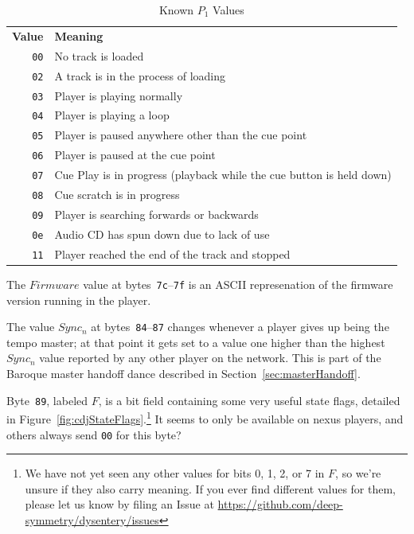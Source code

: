 \documentclass[11pt]{article}
\begin{document}
\begin{longtabu}{rX}
  \toprule

  {\bfseries Value} & {\bfseries Meaning} \endhead

  \bottomrule \\
  \caption{Known $P_1$ Values} \endfoot

  {\tt 00} & No track is loaded \label{table:p1Values} \\

  {\tt 02} & A track is in the process of loading \\

  {\tt 03} & Player is playing normally \\

  {\tt 04} & Player is playing a loop \\

  {\tt 05} & Player is paused anywhere other than the cue point \\

  {\tt 06} & Player is paused at the cue point \\

  {\tt 07} & Cue Play is in progress (playback while the cue button is
  held down) \\

  {\tt 08} & Cue scratch is in progress \\

  {\tt 09} & Player is searching forwards or backwards \\

  {\tt 0e} & Audio CD has spun down due to lack of use \\

  {\tt 11} & Player reached the end of the track and stopped \\

\end{longtabu}

The $Firmware$ value at bytes~{\tt 7c}--{\tt 7f} is an ASCII
represenation of the firmware version running in the player.

The value $Sync_n$ at bytes~{\tt 84}--{\tt 87} changes whenever a
player gives up being the tempo master; at that point it gets set to a
value one higher than the highest $Sync_n$ value reported by any other
player on the network. This is part of the Baroque master handoff
dance described in Section~\ref{sec:masterHandoff}.

Byte~{\tt 89}, labeled $F$, is a bit field containing some very useful
state flags, detailed in Figure~\ref{fig:cdjStateFlags}.\footnote{We
  have not yet seen any other values for bits 0, 1, 2, or 7 in $F$, so
  we're unsure if they also carry meaning. If you ever find different
  values for them, please let us know by filing an Issue at
  \url{https://github.com/deep-symmetry/dysentery/issues}} It seems to
only be available on nexus players, and others always send {\tt 00}
for this byte?
\end{document}
